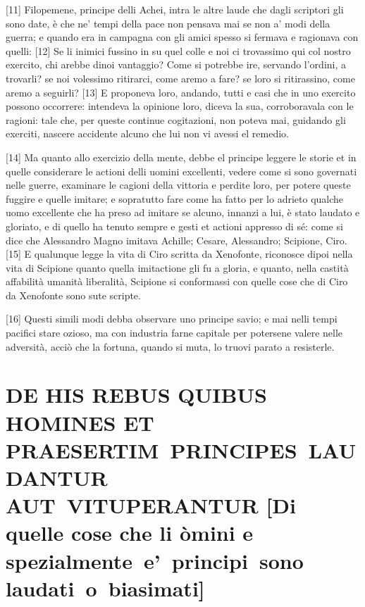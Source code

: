 \quebra

{[}11{]} Filopemene, principe delli Achei, intra le altre laude che
dagli scriptori gli sono date, è che ne' tempi della pace non pensava
mai se non a' modi della guerra; e quando era in campagna con gli amici
spesso si fermava e ragionava con quelli: {[}12{]} Se li inimici fussino
in su quel colle e noi ci trovassimo qui col nostro exercito, chi arebbe
dinoi vantaggio? Come si potrebbe ire, servando l'ordini, a trovarli? se
noi volessimo ritirarci, come aremo a fare? se loro si ritirassino, come
aremo a seguirli? {[}13{]} E proponeva loro, andando, tutti e casi che
in uno exercito possono occorrere: intendeva la opinione loro, diceva la
sua, corroboravala con le ragioni: tale che, per queste continue
cogitazioni, non poteva mai, guidando gli exerciti, nascere accidente
alcuno che lui non vi avessi el remedio.

{[}14{]} Ma quanto allo exercizio della mente, debbe el principe leggere
le storie et in quelle considerare le actioni delli uomini excellenti,
vedere come si sono governati nelle guerre, examinare le cagioni della
vittoria e perdite loro, per potere queste fuggire e quelle imitare; e
sopratutto fare come ha fatto per lo adrieto qualche uomo excellente che
ha preso ad imitare se alcuno, innanzi a lui, è stato laudato e
gloriato, e di quello ha tenuto sempre e gesti et actioni appresso di
sé: come si dice che Alessandro Magno imitava Achille; Cesare,
Alessandro; Scipione, Ciro. {[}15{]} E qualunque legge la vita di Ciro
scritta da Xenofonte, riconosce dipoi nella vita di Scipione quanto
quella imitactione gli fu a gloria, e quanto, nella castità affabilità
umanità liberalità, Scipione si conformassi con quelle cose che di Ciro
da Xenofonte sono sute scripte.

{[}16{]} Questi simili modi debba observare uno principe savio; e mai
nelli tempi pacifici stare ozioso, ma con industria farne capitale per
potersene valere nelle adversità, acciò che la fortuna, quando si muta,
lo truovi parato a resisterle.

\quebra\section{DE HIS REBUS QUIBUS HOMINES ET PRAESERTIM~PRINCIPES~LAUDANTUR AUT~VITUPERANTUR\break
{[}Di quelle cose che li òmini e spezialmente~e'~principi~sono laudati~o~biasimati{]}}

